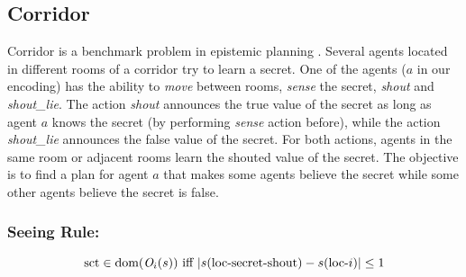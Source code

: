 \subsection{Corridor}
Corridor is a benchmark problem in epistemic planning \cite{DBLP:journals/ai/MuiseBFMMPS22}.
Several agents located in different rooms of a corridor try to learn a secret.
One of the agents ($a$ in our encoding) has the ability to \emph{move} between rooms, \emph{sense} the secret, \emph{shout} and \emph{shout\_lie}.
The action \emph{shout} announces the true value of the secret as long as agent $a$ knows the secret (by performing \emph{sense} action before), while the action \emph{shout\_lie} announces the false value of the secret. For both actions, agents in the same room or adjacent rooms learn the shouted value of the secret. 
The objective is to find a plan for agent $a$ that makes some agents believe the secret while some other agents believe the  secret is false.


\subsubsection{Seeing Rule:}
\[
    \text{sct} \in \textrm{dom}(\mathit{O}_i(s)) \text{ iff } |s(\text{loc-secret-shout}) - s(\text{loc-$i$})| \leq 1
\]




